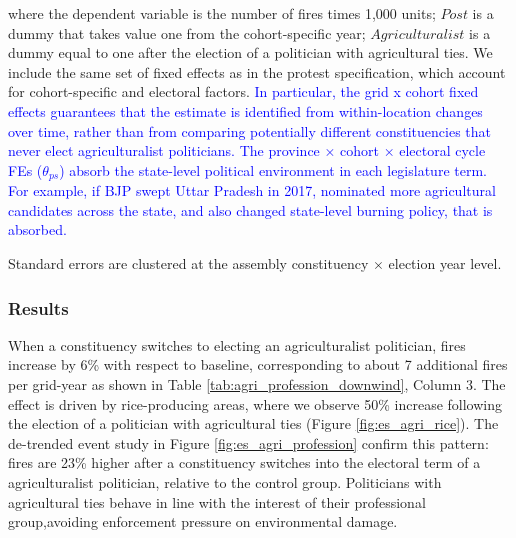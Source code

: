 \documentclass[12pt]{article}
\begin{document}
where the dependent variable is the number of fires times 1,000 units; $Post$ is a dummy that takes value one from the cohort-specific year; $Agriculturalist$ is a dummy equal to one after the election of a politician with agricultural ties. We include the same set of fixed effects as in the protest specification, which account for cohort-specific and electoral factors. \textcolor{blue}{In particular, the grid x cohort fixed effects guarantees that the estimate is identified from within-location changes over time, rather than from comparing potentially different constituencies that never elect agriculturalist politicians. The province × cohort × electoral cycle FEs ($\theta_{ps}$) absorb the state-level political environment in each legislature term. For example, if BJP swept Uttar Pradesh in 2017, nominated more agricultural candidates across the state, and also changed state-level burning policy, that is absorbed. 
}

Standard errors are clustered at the assembly constituency $\times$ election year level. 

\subsubsection{Results\label{sssec:results3}}


When a constituency switches to electing an agriculturalist politician, fires increase by 6\% with respect to baseline, corresponding to about 7 additional fires per grid-year as shown in Table \ref{tab:agri_profession_downwind}, Column 3. The effect is driven by rice-producing areas, where we observe 50\% increase following the election of a politician with agricultural ties  (Figure \ref{fig:es_agri_rice}). The de-trended event study in Figure \ref{fig:es_agri_profession} confirm this pattern:  fires are 23\% higher after a constituency switches into the electoral term of a agriculturalist politician, relative to the control group. Politicians with agricultural ties behave in line with the interest of their professional group,avoiding enforcement pressure on environmental damage.
\end{document}
